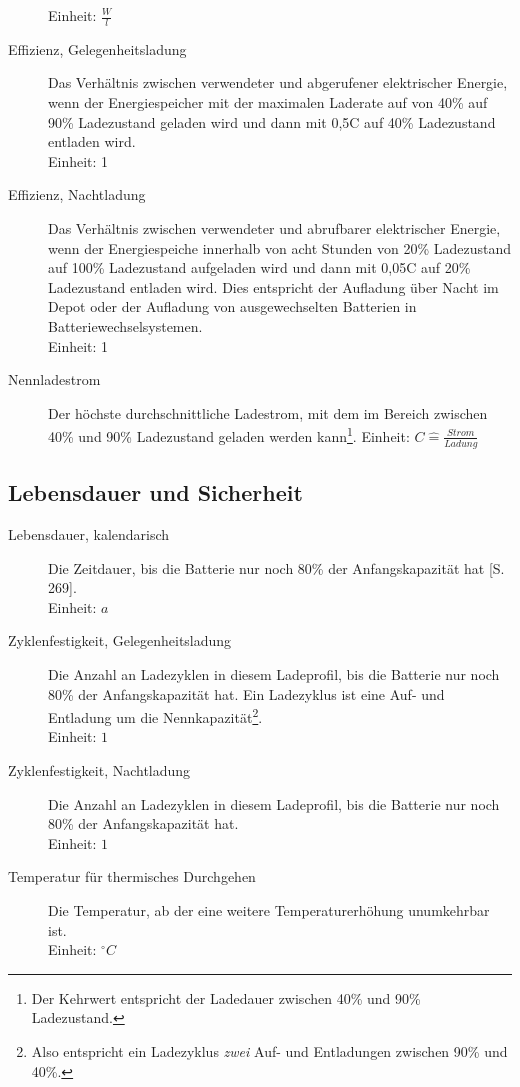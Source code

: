 \begin{description}
	Einheit: $\frac{W}{l}$
	\item[Effizienz, Gelegenheitsladung] Das Verhältnis zwischen verwendeter und abgerufener elektrischer Energie, wenn der Energiespeicher mit der maximalen Laderate auf von 40\% auf 90\% Ladezustand geladen wird und dann mit 0,5C auf 40\% Ladezustand entladen wird.\\
	Einheit: 1
	\item[Effizienz, Nachtladung] Das Verhältnis zwischen verwendeter und abrufbarer elektrischer Energie, wenn der Energiespeiche innerhalb von acht Stunden von 20\% Ladezustand auf 100\% Ladezustand aufgeladen wird und dann mit 0,05C auf 20\% Ladezustand entladen wird. Dies entspricht der Aufladung über Nacht im Depot oder der Aufladung von ausgewechselten Batterien in Batteriewechselsystemen.\\
	Einheit: 1
	\item[Nennladestrom] Der höchste durchschnittliche Ladestrom, mit dem im Bereich zwischen 40\% und 90\% Ladezustand geladen werden kann\footnote{Der Kehrwert entspricht der Ladedauer zwischen 40\% und 90\% Ladezustand.}.
	Einheit: $C\hat{=} \frac{Strom}{Ladung}$
\end{description}

\subsection{Lebensdauer und Sicherheit}
\begin{description}
	\item[Lebensdauer, kalendarisch] Die Zeitdauer, bis die Batterie nur noch 80\% der Anfangskapazität hat \cite{Sterner:2014}[S. 269]. \\
	Einheit: $a$
	\item[Zyklenfestigkeit, Gelegenheitsladung] Die Anzahl an Ladezyklen in diesem Ladeprofil, bis die Batterie nur noch 80\% der Anfangskapazität hat. Ein Ladezyklus ist eine Auf- und Entladung um die Nennkapazität\footnote{Also entspricht ein Ladezyklus \emph{zwei} Auf- und Entladungen zwischen 90\% und 40\%.}.\\
	Einheit: $1$
	\item[Zyklenfestigkeit, Nachtladung] Die Anzahl an Ladezyklen in diesem Ladeprofil, bis die Batterie nur noch 80\% der Anfangskapazität hat.\\
	Einheit: $1$
	\item[Temperatur für thermisches Durchgehen] Die Temperatur, ab der eine weitere Temperaturerhöhung unumkehrbar ist.\\
	Einheit: $^\circ C$
\end{description}


